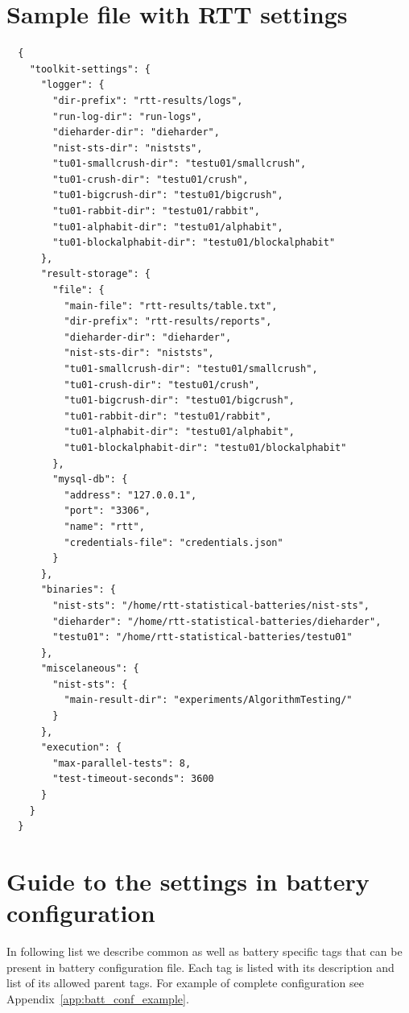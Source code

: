 \documentclass[
  digital,  	%
  color,		%
  oneside,   	%
  12pt,
  nocover,
  notable,
  nolof,
  nolot,
]{fithesis3}
\theoremstyle{definition}
\theoremstyle{remark}
\begin{document}
\chapter{Sample file with RTT settings}
\label{app:rtt_sett_json}
\begin{verbatim}
  {
    "toolkit-settings": {
      "logger": {
        "dir-prefix": "rtt-results/logs",
        "run-log-dir": "run-logs",
        "dieharder-dir": "dieharder",
        "nist-sts-dir": "niststs",
        "tu01-smallcrush-dir": "testu01/smallcrush",
        "tu01-crush-dir": "testu01/crush",
        "tu01-bigcrush-dir": "testu01/bigcrush",
        "tu01-rabbit-dir": "testu01/rabbit",
        "tu01-alphabit-dir": "testu01/alphabit",
        "tu01-blockalphabit-dir": "testu01/blockalphabit"
      },
      "result-storage": {
        "file": {
          "main-file": "rtt-results/table.txt",
          "dir-prefix": "rtt-results/reports",
          "dieharder-dir": "dieharder",
          "nist-sts-dir": "niststs",
          "tu01-smallcrush-dir": "testu01/smallcrush",
          "tu01-crush-dir": "testu01/crush",
          "tu01-bigcrush-dir": "testu01/bigcrush",
          "tu01-rabbit-dir": "testu01/rabbit",
          "tu01-alphabit-dir": "testu01/alphabit",
          "tu01-blockalphabit-dir": "testu01/blockalphabit"
        },
        "mysql-db": {
          "address": "127.0.0.1",
          "port": "3306",
          "name": "rtt",
          "credentials-file": "credentials.json"
        }
      },
      "binaries": {
        "nist-sts": "/home/rtt-statistical-batteries/nist-sts",
        "dieharder": "/home/rtt-statistical-batteries/dieharder",
        "testu01": "/home/rtt-statistical-batteries/testu01"
      },
      "miscelaneous": {
        "nist-sts": {
          "main-result-dir": "experiments/AlgorithmTesting/"
        }
      },
      "execution": {
        "max-parallel-tests": 8,
        "test-timeout-seconds": 3600
      }
    }
  }
\end{verbatim}

\chapter{Guide to the settings in battery configuration}
\label{app:batt_conf_guide}
In following list we describe common as well as battery specific tags that can be present in battery configuration file. Each tag is listed with its description and list of its allowed parent tags. For example of complete configuration see Appendix~\ref{app:batt_conf_example}.
\end{document}
